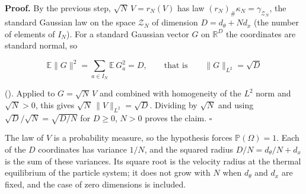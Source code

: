 \documentclass[11pt,a4paper]{article}
\begin{document}
\textbf{Proof.} By the previous step, \(\sqrt N\,V=r_N(V)\) has law \((r_N)_\#\kappa_N=\gamma_{\mathcal Z_N}\), the standard Gaussian law on the space \(\mathcal Z_N\) of dimension \(D=d_\theta+Nd_x\) (the number of elements of \(I_N\)). For a standard Gaussian vector \(G\) on \(\mathbb R^D\) the coordinates are standard normal, so


\[\mathbb E\|G\|^2=\sum_{a\in I_N}\mathbb E\,G_a^2=D,\qquad\text{that is}\qquad\|G\|_{L^2}=\sqrt D\]


(\cite[Section~3.40.1]{LangevinLean2026Kinetic}). Applied to \(G=\sqrt N\,V\) and combined with homogeneity of the \(L^2\) norm and \(\sqrt N>0\), this gives \(\sqrt N\,\|V\|_{L^2}=\sqrt D\). Dividing by \(\sqrt N\) and using \(\sqrt D/\sqrt N=\sqrt{D/N}\) for \(D\ge0\), \(N>0\) proves the claim. \(\square\)




The law of \(V\) is a probability measure, so the hypothesis forces \(\mathbb P(\Omega)=1\). Each of the \(D\) coordinates has variance \(1/N\), and the squared radius \(D/N=d_\theta/N+d_x\) is the sum of these variances. Its square root is the velocity radius at the thermal equilibrium of the particle system; it does not grow with \(N\) when \(d_\theta\) and \(d_x\) are fixed, and the case of zero dimensions is included.
\end{document}
